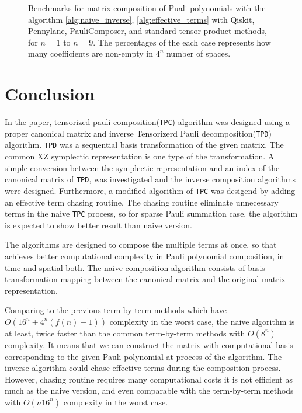 \documentclass[twocolumn]{article}
\begin{document}
\begin{figure}[ht]
    \caption{Benchmarks for matrix composition of Puali polynomials with the algorithm \ref{alg:naive_inverse}, \ref{alg:effective_terms} with 
    Qiskit, Pennylane, PauliComposer, and standard tensor product methods, for $n=1$ to $n=9$. 
    The percentages of the each case represents how many coefficients are non-empty in $4^n$ number of spaces.}
        \label{fig:results}
\end{figure}

\section{Conclusion}

In the paper, tensorized pauli composition(\texttt{TPC}) algorithm was designed 
using a proper canonical matrix and inverse Tensorizerd Pauli decomposition(\texttt{TPD}) algorithm\cite{Hantzko_2024}.
\texttt{TPD} was a sequential basis transformation of the given matrix.
The common XZ symplectic representation is one type of the transformation.
A simple conversion between the symplectic representation and an index of the canonical matrix of \texttt{TPD}, 
was investigated and the inverse composition algorithms were designed.
Furthermore, a modified algorithm of \texttt{TPC} was desigend by adding an effective term chasing routine.  
The chasing routine eliminate unnecessary terms in the naive \texttt{TPC} process,
so for sparse Pauli summation case, the algorithm is expected to show better result than naive version.

The algorithms are designed to compose the multiple terms at once, 
so that achieves better computational complexity in Pauli polynomial composition, in time and spatial both. 
The naive composition algorithm consists of basis transformation mapping between 
the canonical matrix and the original matrix representation.

Comparing to the previous term-by-term methods which have $O(16^n + 4^n(f(n)-1))$ complexity in the worst case, 
the naive algorithm is at least, twice faster than the common term-by-term methods  with $O(8^n)$ complexity. 
It means that we can construct the matrix with computational basis corresponding to the given 
Pauli-polynomial at process of the algorithm. 
The inverse algorithm could chase effective terms during the composition process. 
However, chasing routine requires many computational costs it is not efficient as much as the naive version,
and even comparable with the term-by-term methods with $O(n16^n)$ complexity in the worst case.
\end{document}
